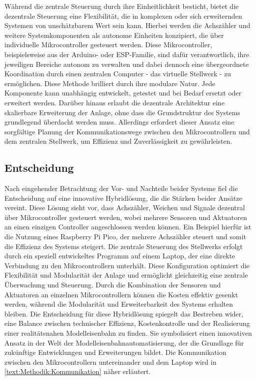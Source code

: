 Während die zentrale Steuerung durch ihre Einheitlichkeit besticht, bietet die dezentrale Steuerung eine Flexibilität, die in komplexen oder sich erweiternden Systemen von unschätzbarem Wert sein kann. Hierbei werden die Achszähler und weitere Systemkomponenten als autonome Einheiten konzipiert, die über individuelle Mikrocontroller gesteuert werden. Diese Mikrocontroller, beispielsweise aus der Arduino- oder ESP-Familie, sind dafür verantwortlich, ihre jeweiligen Bereiche autonom zu verwalten und dabei dennoch eine übergeordnete Koordination durch einen zentralen Computer - das virtuelle Stellwerk - zu ermöglichen.
\newline
Diese Methode brilliert durch ihre modulare Natur. Jede Komponente kann unabhängig entwickelt, getestet und bei Bedarf ersetzt oder erweitert werden. Darüber hinaus erlaubt die dezentrale Architektur eine skalierbare Erweiterung der Anlage, ohne dass die Grundstruktur des Systems grundlegend überdacht werden muss. Allerdings erfordert dieser Ansatz eine sorgfältige Planung der Kommunikationswege zwischen den Mikrocontrollern und dem zentralen Stellwerk, um Effizienz und Zuverlässigkeit zu gewährleisten.

\subsection{Entscheidung}\label{text:Methodik:Systemkonfiguration:Entscheidung}

Nach eingehender Betrachtung der Vor- und Nachteile beider Systeme fiel die Entscheidung auf eine innovative Hybridlösung, die die Stärken beider Ansätze vereint. Diese Lösung sieht vor, dass Achszähler, Weichen und Signale dezentral über Mikrocontroller gesteuert werden, wobei mehrere Sensoren und Aktuatoren an einen einzigen Controller angeschlossen werden können. Ein Beispiel hierfür ist die Nutzung eines Raspberry Pi Pico, der mehrere Achszähler steuert und somit die Effizienz des Systems steigert.
\newline
Die zentrale Steuerung des Stellwerks erfolgt durch ein speziell entwickeltes Programm auf einem Laptop, der eine direkte Verbindung zu den Mikrocontrollern unterhält. Diese Konfiguration optimiert die Flexibilität und Modularität der Anlage und ermöglicht gleichzeitig eine zentrale Überwachung und Steuerung. Durch die Kombination der Sensoren und Aktuatoren an einzelnen Mikrocontrollern können die Kosten effektiv gesenkt werden, während die Modularität und Erweiterbarkeit des Systems erhalten bleiben.
\newline
Die Entscheidung für diese Hybridlösung spiegelt das Bestreben wider, eine Balance zwischen technischer Effizienz, Kostenkontrolle und der Realisierung einer realitätsnahen Modelleisenbahn zu finden. Sie symbolisiert einen innovativen Ansatz in der Welt der Modelleisenbahnautomatisierung, der die Grundlage für zukünftige Entwicklungen und Erweiterungen bildet.
\newline
Die Kommunikation zwischen den Mikrocontrollern untereinander und dem Laptop wird in \autoref{text:Methodik:Kommunikation} näher erläutert.
